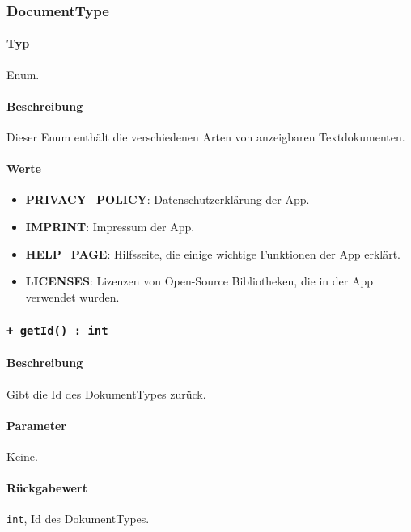 \subsubsection{DocumentType}
\paragraph*{Typ}
Enum.
\paragraph*{Beschreibung}
Dieser Enum enthält die verschiedenen Arten von anzeigbaren Textdokumenten.

\paragraph*{Werte}
\begin{itemize}
    \item \textbf{PRIVACY\_POLICY}: Datenschutzerklärung der App.
    \item \textbf{IMPRINT}: Impressum der App.
    \item \textbf{HELP\_PAGE}: Hilfsseite, die einige wichtige Funktionen der App erklärt.
    \item \textbf{LICENSES}: Lizenzen von Open-Source Bibliotheken, die in der App verwendet wurden.
\end{itemize}

\subsubsection*{\texttt{+ getId() : int}}%
\paragraph*{Beschreibung}
Gibt die Id des DokumentTypes zurück.
\paragraph*{Parameter}
Keine.
\paragraph*{Rückgabewert}
\texttt{int}, Id des DokumentTypes.